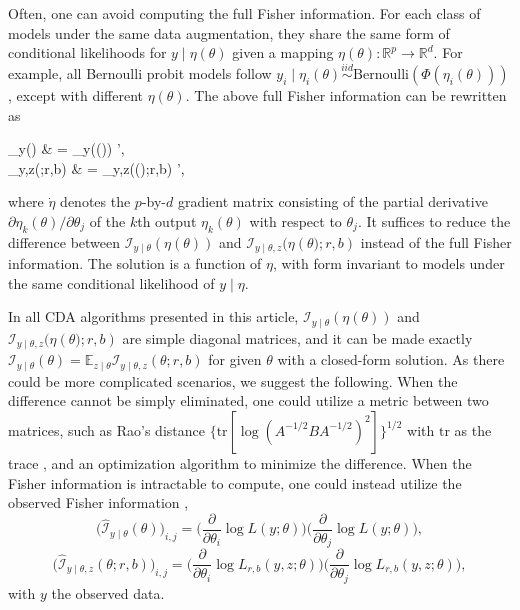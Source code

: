 \documentclass[11pt]{article}
\newcommand{\be}{\begin{equs}}
\newcommand{\ee}{\end{equs}}
\newcommand{\bb}[1]{\mathbb{#1}}
\newcommand{\mc}[1]{\mathcal{#1}}
\newcommand{\Bern}{\text{Bernoulli}}
\begin{document}
{
Often, one can avoid computing the full Fisher information. For  each class of models under the same data augmentation, they share the same form of conditional likelihoods for $y\mid \eta(\theta)$ given a mapping $\eta(\theta):\bb
R^p\rightarrow \bb R^d $.
 For example,  all Bernoulli probit models  follow $y_{i}\mid \eta_{i}(\theta) \stackrel{iid}{\sim}\Bern( \Phi(\eta_{i}(\theta)) )$, except with different  $\eta(\theta)$. The above full Fisher information can be rewritten as
 \be\mc I_{y\mid \theta}({\theta})  &  =  \dot \eta\mc I_{y\mid \theta}(\eta({\theta}))  \dot \eta', \\
  \mc I_{y\mid \theta,z}({\theta};r,b) & = \dot \eta\mc I_{y\mid \theta,z}(\eta({\theta)};r,b)  \dot \eta',
\ee
where $\dot \eta$ denotes the $p$-by-$d$ gradient matrix consisting of the partial
derivative ${\partial
\eta_{k}(\theta)}/{\partial \theta_j}$ of  the $k$th output 
$\eta_{k}(\theta)$ with respect to $\theta_j$. It suffices to reduce the difference between  $\mc I_{y\mid \theta}(\eta({\theta}))$  and $\mc I_{y\mid \theta,z}(\eta({\theta)};r,b)$ instead of the full Fisher
 information. The solution is a function of $\eta$, with form invariant to models under the same conditional likelihood of $y\mid \eta$.
 }


{
In all CDA algorithms presented in
this article,  $\mc I_{y\mid \theta}(\eta({\theta}))$  and $\mc I_{y\mid \theta,z}(\eta({\theta)};r,b)$ are simple diagonal matrices, and 
 it can be made exactly $\mc I_{y\mid \theta}({\theta})=\bb E_{z\mid \theta}\mc I_{y\mid \theta,z}({\theta};r,b)$ for given $\theta$ with a closed-form
solution. As there could be more complicated
scenarios, we suggest the following. When the difference cannot
be simply eliminated, one could utilize a metric between two matrices, such
as Rao's distance $\{\text{tr}
[\log(A^{-1/2}BA^{-1/2})^{2}]\}^{1/2}$ with $\text{tr}$ as the trace \citep{atkinson1981rao},
and an optimization algorithm to minimize the difference. When the Fisher information
is intractable to compute, one could instead utilize the observed Fisher information
\citep{efron1978assessing},    
$$\bigg(\hat{\mc I}_{y\mid \theta}({\theta}) \bigg)_{i,j}   =  \bigg( \frac{\partial}{\partial \theta_i} \log L(y;\theta) \bigg) \bigg( \frac{\partial}{\partial \theta_j} \log L(y;\theta) \bigg),$$ 
$$ \bigg(  \hat{\mc I}_{y\mid \theta,z}({\theta};r,b) \bigg)_{i,j} = \bigg( \frac{\partial}{\partial \theta_i} \log L_{r,b}(y,z;\theta) \bigg)\bigg( \frac{\partial}{\partial \theta_j} \log L_{r,b}(y,z;\theta) \bigg),$$
with $y$ the observed data.
}
\end{document}
